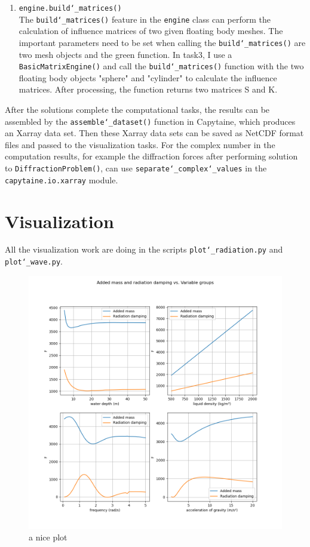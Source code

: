\documentclass{article}
\begin{document}
\begin{enumerate}
    \item \texttt{engine.build\char`_matrices()}\\
    The \texttt{build\char`_matrices()} feature in the \texttt{engine} class can perform the calculation of influence matrices of two given floating body meshes. The important parameters need to be set when calling the \texttt{build\char`_matrices()} are two mesh objects and the green function. In task3, I use a \texttt{BasicMatrixEngine()} and call the \texttt{build\char`_matrices()} function with the two floating body objects "sphere" and "cylinder" to calculate the influence matrices. After processing, the function returns two matrices S and K.
\end{enumerate}
After the solutions complete the computational tasks, the results can be assembled by the \texttt{assemble\char`_dataset()} function in Capytaine, which produces an Xarray data set. Then these Xarray data sets can be saved as NetCDF format files and passed to the visualization tasks. For the complex number in the computation results, for example the diffraction forces after performing solution to \texttt{DiffractionProblem()}, can use \texttt{separate\char`_complex\char`_values} in the \texttt{capytaine.io.xarray} module.

\section{Visualization}
All the visualization work are doing in the scripts \texttt{plot\char`_radiation.py} and \texttt{plot\char`_wave.py}.
\begin{figure}[h]
    \centering
    \includegraphics[width=1\textwidth]{img/1_radiation.png}
    \caption{a nice plot}
    \label{fig:plt1}
\end{figure}
\end{document}
